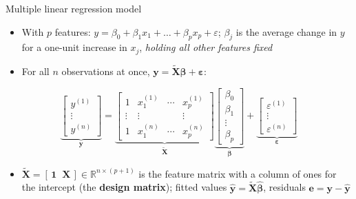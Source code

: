 \begin{frame}{Multiple linear regression model}
    \begin{itemize}
        \item With $p$ features: $y = \beta_0 + \beta_1 x_1 + \dots + \beta_p x_p + \varepsilon$; $\beta_j$ is the average change in $y$ for a one-unit increase in $x_j$, \emph{holding all other features fixed}
        \item For all $n$ observations at once, $\mathbf{y} = \tilde{\mathbf{X}} \symbf{\beta} + \symbf{\varepsilon}$:
    \end{itemize}
    \[
        \underbrace{\begin{bmatrix} y^{(1)} \\ \vdots \\ y^{(n)} \end{bmatrix}}_{\mathbf{y}}
        = \underbrace{\begin{bmatrix} 1 & x_1^{(1)} & \cdots & x_p^{(1)} \\ \vdots & \vdots & & \vdots \\ 1 & x_1^{(n)} & \cdots & x_p^{(n)} \end{bmatrix}}_{\tilde{\mathbf{X}}}
        \underbrace{\begin{bmatrix} \beta_0 \\ \beta_1 \\ \vdots \\ \beta_p \end{bmatrix}}_{\symbf{\beta}}
        + \underbrace{\begin{bmatrix} \varepsilon^{(1)} \\ \vdots \\ \varepsilon^{(n)} \end{bmatrix}}_{\symbf{\varepsilon}}
    \]
    \begin{itemize}
        \item $\tilde{\mathbf{X}} = [\,\mathbf{1} \;\; \mathbf{X}\,] \in \mathbb{R}^{n \times (p+1)}$ is the feature matrix with a column of ones for the intercept (the \textbf{design matrix}); fitted values $\hat{\mathbf{y}} = \tilde{\mathbf{X}} \hat{\symbf{\beta}}$, residuals $\mathbf{e} = \mathbf{y} - \hat{\mathbf{y}}$
    \end{itemize}
\end{frame}


